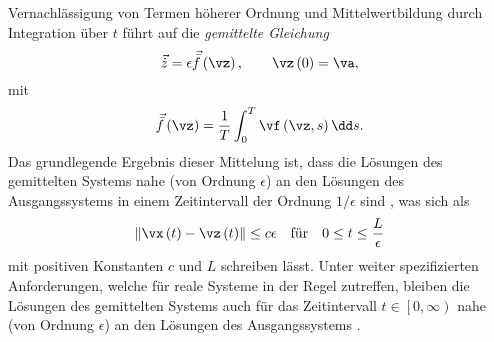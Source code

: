 Vernachlässigung von Termen höherer Ordnung und Mittelwertbildung durch Integration über $t$ führt auf die \textit{gemittelte Gleichung}
\begin{equation}
	\vec{\dot{z}} = \epsilon \vec{\bar{f}}\left(\vz\right), \qquad  \vz\left(0\right) = \va, 
\label{eq:AveragingGemittelteGleichung}
\end{equation}
%
%
mit
%
%
\begin{equation}
	\vec{\bar{f}}\left(\vz\right) = \frac{1}{T} \int^T_0{\vf\left(\vz,s\right) \dd s} .
\label{eq:AveragingGemittelteGleichungRechteSeite}
\end{equation}
%
%
%
Das grundlegende Ergebnis dieser Mittelung ist, dass die Lösungen des gemittelten Systems nahe (von Ordnung $\epsilon$) 
an den Lösungen des Ausgangssystems in einem Zeitintervall der Ordnung $1/\epsilon$ sind \cite{Sanders:AveragingMethods2007}, was sich als
\begin{equation}
	\left\| \vx\left(t\right) - \vz\left(t\right) \right\| \leq c \epsilon \quad \text{für} \quad 0 \leq t \leq \frac{L}{\epsilon}
\label{eq:AveragingEpsilonNah}
\end{equation}
mit positiven Konstanten $c$ und $L$ schreiben lässt. Unter weiter spezifizierten Anforderungen, 
welche für reale Systeme in der Regel zutreffen, bleiben die Lösungen des gemittelten Systems 
auch für das Zeitintervall $t \in \left[0, \infty \right)$ nahe (von Ordnung $\epsilon$) 
an den Lösungen des Ausgangssystems \cite{Sanders:AveragingMethods2007}.






